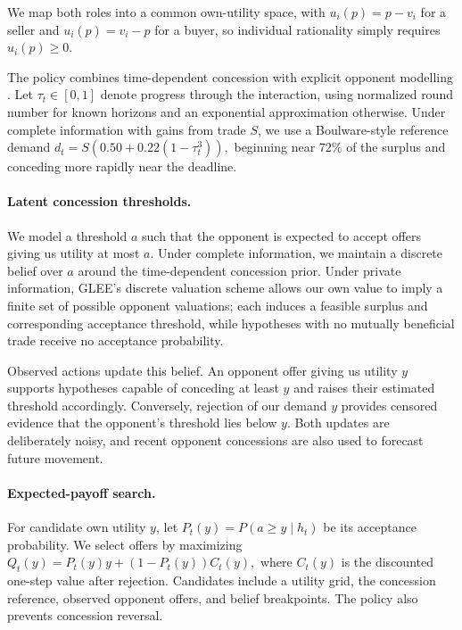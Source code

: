 \documentclass{article}
\begin{document}
We map both roles into a common own-utility space, with $u_i(p)=p-v_i$ for a seller and $u_i(p)=v_i-p$ for a buyer, so individual rationality simply requires $u_i(p)\geq0$.

The policy combines time-dependent concession \citep{faratin1998negotiation} with explicit opponent modelling \citep{baarslag2016learning}.
Let $\tau_t\in[0,1]$ denote progress through the interaction, using normalized round number for known horizons and an exponential approximation otherwise.
Under complete information with gains from trade $S$, we use a Boulware-style reference demand
\(
    d_t = S\left(0.50+0.22(1-\tau_t^3)\right),
    \label{eq:negotiation-aspiration}
\)
beginning near $72\%$ of the surplus and conceding more rapidly near the deadline.

\paragraph{Latent concession thresholds.}
We model a threshold $a$ such that the opponent is expected to accept offers giving us utility at most $a$.
Under complete information, we maintain a discrete belief over $a$ around the time-dependent concession prior.
Under private information, GLEE's discrete valuation scheme allows our own value to imply a finite set of possible opponent valuations; each induces a feasible surplus and corresponding acceptance threshold, while hypotheses with no mutually beneficial trade receive no acceptance probability.

Observed actions update this belief.
An opponent offer giving us utility $y$ supports hypotheses capable of conceding at least $y$ and raises their estimated threshold accordingly.
Conversely, rejection of our demand $y$ provides censored evidence that the opponent's threshold lies below $y$.
Both updates are deliberately noisy, and recent opponent concessions are also used to forecast future movement.

\paragraph{Expected-payoff search.}
For candidate own utility $y$, let
\(
    P_t(y)=P(a\geq y\mid h_t)
\)
be its acceptance probability.
We select offers by maximizing
\(
    Q_t(y)
       =
       P_t(y)y
       +(1-P_t(y))C_t(y),
    \label{eq:negotiation-choice}
\)
where $C_t(y)$ is the discounted one-step value after rejection.
Candidates include a utility grid, the concession reference, observed opponent offers, and belief breakpoints.
The policy also prevents concession reversal.
\end{document}
